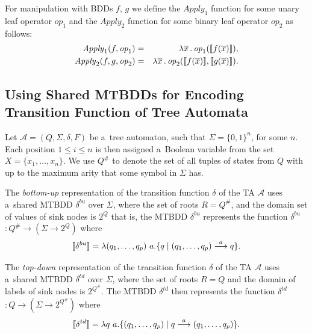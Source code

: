 For manipulation with BDDs $f$, $g$ we define the $\mathit{Apply}_1$ function
for some unary leaf operator $\mathit{op}_1$ and the $\mathit{Apply}_2$ function for some
binary leaf operator $\mathit{op}_2$ as follows: 
\begin{eqnarray}
\mathit{Apply}_1(f,\mathit{op}_1) & = & \lambda
\overline{x}\,.\,\mathit{op}_1(\text{\textlbrackdbl}f(\overline{x})\text{\textrbrackdbl}),\\
\mathit{Apply}_2(f, g, \mathit{op}_2) & = & \lambda
\overline{x}\,.\,\mathit{op}_2(\text{\textlbrackdbl}f(\overline{x})\text{\textrbrackdbl}, \text{\textlbrackdbl}g(\overline{x})\text{\textrbrackdbl}).
\end{eqnarray}

\subsection[Usage
of MTBDDs with TA]{Using Shared MTBDDs for Encoding Transition Function of Tree Automata} Let $\mathcal{A} = (Q, \Sigma, \delta, F)$
be a~tree automaton, such that $\Sigma = \{0, 1\}^n$, for some $n$. Each
position $1 \leq i \leq n$ is then assigned a~Boolean variable from the set $X =
\{x_1,\ldots,x_n\}$. We use $Q^\#$ to denote the set of all tuples of states from $Q$ with up to the
maximum arity that some symbol in $\Sigma$ has.

The \emph{bottom-up} representation of the transition function $\delta$ of the
TA $\mathcal{A}$ uses a~shared MTBDD $\delta^{bu}$ over $\Sigma$, where the set
of roots $R = Q^\#$, and the domain set of values of sink nodes is $2^Q$ that
is, the MTBDD $\delta^{bu}$ represents the function \textlbrackdbl $\delta^{bu}$
\textrbrackdbl $: Q^\# \rightarrow (\Sigma \rightarrow 2^Q)$ where
 \begin{equation}
  \text{\textlbrackdbl} \delta^{bu} \text{\textrbrackdbl} =
 \lambda (q_1,\ldots,q_p)\ a . \{q \mid (q_1,\ldots,q_p)
 \overset{a}{\longrightarrow} q\}. \end{equation}

The \emph{top-down} representation of the transition function $\delta$ of the TA
$\mathcal{A}$ uses a~shared MTBDD $\delta^{td}$ over $\Sigma$, where the set of
roots $R = Q$ and the domain of labels of sink nodes is $2^{Q^\#}$. The MTBDD
$\delta^{td}$ then represents the function \textlbrackdbl $\delta^{td}$
\textrbrackdbl $: Q \rightarrow (\Sigma \rightarrow 2^{Q^\#})$ where
\begin{equation} \text{\textlbrackdbl} \delta^{td} \text{\textrbrackdbl} =
\lambda q\ a .
\{(q_1,\ldots,q_p) \mid q \overset{a}{\longrightarrow} (q_1,\ldots,q_p)\}.
\end{equation}

